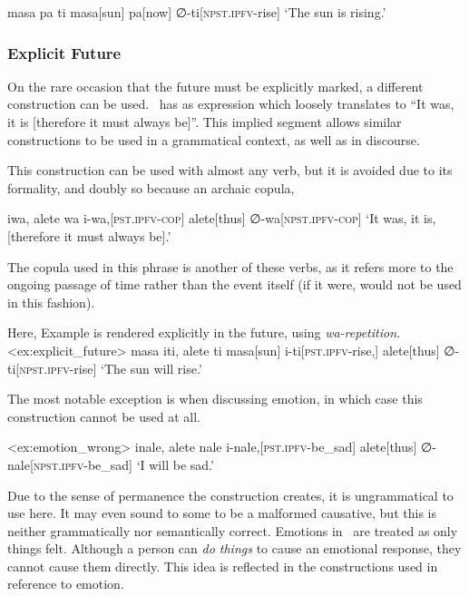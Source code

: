 \ex
\begingl
\glpreamble masa pa ti
\endpreamble
masa[sun]
pa[now]
∅-ti[\textsc{npst.ipfv-}rise]
\glft `The sun is rising.'
\endgl
\xe

\subsubsection{Explicit Future}
On the rare occasion that the future must be explicitly marked, a different construction can be used.
\langname\ has as expression which loosely translates to ``It was, it is [therefore it must always be]''.
This implied segment allows similar constructions to be used in a grammatical context, as well as in discourse.

This construction can be used with almost any verb, but it is avoided due to its formality, and doubly so because an archaic copula, 

\ex
\begingl
\glpreamble iwa, alete wa
\endpreamble
i-wa,[\textsc{pst.ipfv-cop}]
alete[thus]
∅-wa[\textsc{npst.ipfv-cop}]
\glft `It was, it is, [therefore it must always be].'
\endgl
\xe

The copula used in this phrase is another of these verbs, as it refers more to the ongoing passage of time rather than the event itself (if it were,  would not be used in this fashion).

Here, Example  is rendered explicitly in the future, using \textit{wa-repetition.}
\ex<ex:explicit_future>
\begingl
\glpreamble masa iti, alete ti
\endpreamble
masa[sun]
i-ti[\textsc{pst.ipfv-}rise,]
alete[thus]
∅-ti[\textsc{npst.ipfv-}rise]
\glft `The sun will rise.'
\endgl
\xe

The most notable exception is when discussing emotion, in which case this construction cannot be used at all.

\ex<ex:emotion_wrong>
\begingl
\glpreamble \ljudge{*} inale, alete nale
\endpreamble
i-nale,[\textsc{pst.ipfv-}be\_sad]
alete[thus]
∅-nale[\textsc{npst.ipfv-}be\_sad]
\glft `I will be sad.'
\endgl
\xe

Due to the sense of permanence the construction creates, it is ungrammatical to use here.
It may even sound to some to be a malformed causative, but this is neither grammatically nor semantically correct.
Emotions in \langname\ are treated as only things felt.
Although a person can \textit{do things} to cause an emotional response, they cannot cause them directly.
This idea is reflected in the constructions used in reference to emotion.

